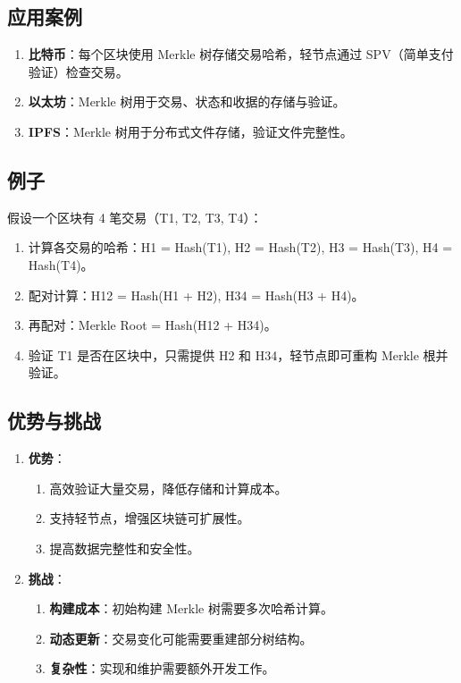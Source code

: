 \documentclass[12pt]{ctexart}
\begin{document}
\subsection{应用案例}
\begin{enumerate}
    \item \textbf{比特币}：每个区块使用 Merkle 树存储交易哈希，轻节点通过 SPV（简单支付验证）检查交易。
    \item \textbf{以太坊}：Merkle 树用于交易、状态和收据的存储与验证。
    \item \textbf{IPFS}：Merkle 树用于分布式文件存储，验证文件完整性。
\end{enumerate}

\subsection{例子}
假设一个区块有 4 笔交易（T1, T2, T3, T4）：
\begin{enumerate}
    \item 计算各交易的哈希：H1 = Hash(T1), H2 = Hash(T2), H3 = Hash(T3), H4 = Hash(T4)。
    \item 配对计算：H12 = Hash(H1 + H2), H34 = Hash(H3 + H4)。
    \item 再配对：Merkle Root = Hash(H12 + H34)。
    \item 验证 T1 是否在区块中，只需提供 H2 和 H34，轻节点即可重构 Merkle 根并验证。
\end{enumerate}

\subsection{优势与挑战}
\begin{enumerate}
    \item \textbf{优势}：
        \begin{enumerate}
            \item 高效验证大量交易，降低存储和计算成本。
            \item 支持轻节点，增强区块链可扩展性。
            \item 提高数据完整性和安全性。
        \end{enumerate}
    \item \textbf{挑战}：
        \begin{enumerate}
            \item \textbf{构建成本}：初始构建 Merkle 树需要多次哈希计算。
            \item \textbf{动态更新}：交易变化可能需要重建部分树结构。
            \item \textbf{复杂性}：实现和维护需要额外开发工作。
        \end{enumerate}
\end{enumerate}
\end{document}

